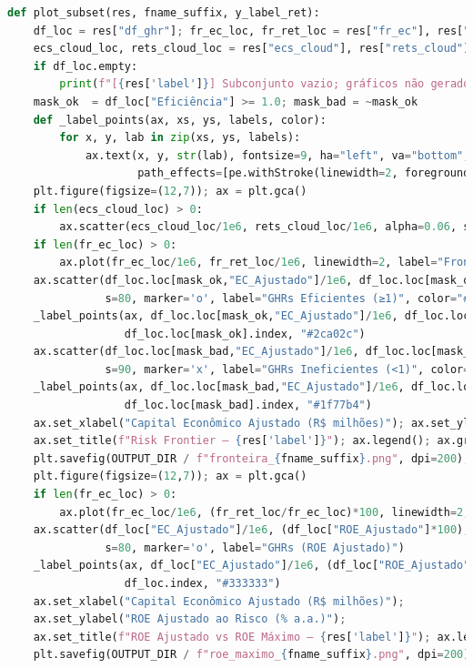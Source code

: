 \documentclass[11pt,a4paper]{article}
\newcommand{\1}{\mathbf{1}}
\begin{document}
\begin{lstlisting}[language=Python, caption={risk_frontier.py (versão completa com normalização por prazo e visões)}]
def plot_subset(res, fname_suffix, y_label_ret):
    df_loc = res["df_ghr"]; fr_ec_loc, fr_ret_loc = res["fr_ec"], res["fr_ret"]
    ecs_cloud_loc, rets_cloud_loc = res["ecs_cloud"], res["rets_cloud"]
    if df_loc.empty:
        print(f"[{res['label']}] Subconjunto vazio; gráficos não gerados."); return
    mask_ok  = df_loc["Eficiência"] >= 1.0; mask_bad = ~mask_ok
    def _label_points(ax, xs, ys, labels, color):
        for x, y, lab in zip(xs, ys, labels):
            ax.text(x, y, str(lab), fontsize=9, ha="left", va="bottom", color=color,
                    path_effects=[pe.withStroke(linewidth=2, foreground="white")])
    plt.figure(figsize=(12,7)); ax = plt.gca()
    if len(ecs_cloud_loc) > 0:
        ax.scatter(ecs_cloud_loc/1e6, rets_cloud_loc/1e6, alpha=0.06, s=4, label="Carteiras Simuladas")
    if len(fr_ec_loc) > 0:
        ax.plot(fr_ec_loc/1e6, fr_ret_loc/1e6, linewidth=2, label="Fronteira Eficiente")
    ax.scatter(df_loc.loc[mask_ok,"EC_Ajustado"]/1e6, df_loc.loc[mask_ok,"Ret_Metrica"]/1e6,
               s=80, marker='o', label="GHRs Eficientes (≥1)", color="#2ca02c")
    _label_points(ax, df_loc.loc[mask_ok,"EC_Ajustado"]/1e6, df_loc.loc[mask_ok,"Ret_Metrica"]/1e6,
                  df_loc.loc[mask_ok].index, "#2ca02c")
    ax.scatter(df_loc.loc[mask_bad,"EC_Ajustado"]/1e6, df_loc.loc[mask_bad,"Ret_Metrica"]/1e6,
               s=90, marker='x', label="GHRs Ineficientes (<1)", color="#1f77b4")
    _label_points(ax, df_loc.loc[mask_bad,"EC_Ajustado"]/1e6, df_loc.loc[mask_bad,"Ret_Metrica"]/1e6,
                  df_loc.loc[mask_bad].index, "#1f77b4")
    ax.set_xlabel("Capital Econômico Ajustado (R$ milhões)"); ax.set_ylabel(y_label_ret)
    ax.set_title(f"Risk Frontier – {res['label']}"); ax.legend(); ax.grid(True); plt.tight_layout()
    plt.savefig(OUTPUT_DIR / f"fronteira_{fname_suffix}.png", dpi=200); plt.show()
    plt.figure(figsize=(12,7)); ax = plt.gca()
    if len(fr_ec_loc) > 0:
        ax.plot(fr_ec_loc/1e6, (fr_ret_loc/fr_ec_loc)*100, linewidth=2, label="ROE Máximo (Fronteira)")
    ax.scatter(df_loc["EC_Ajustado"]/1e6, (df_loc["ROE_Ajustado"]*100),
               s=80, marker='o', label="GHRs (ROE Ajustado)")
    _label_points(ax, df_loc["EC_Ajustado"]/1e6, (df_loc["ROE_Ajustado"]*100),
                  df_loc.index, "#333333")
    ax.set_xlabel("Capital Econômico Ajustado (R$ milhões)");
    ax.set_ylabel("ROE Ajustado ao Risco (% a.a.)");
    ax.set_title(f"ROE Ajustado vs ROE Máximo – {res['label']}"); ax.legend(); ax.grid(True); plt.tight_layout()
    plt.savefig(OUTPUT_DIR / f"roe_maximo_{fname_suffix}.png", dpi=200); plt.show()


\end{lstlisting}
\end{document}
